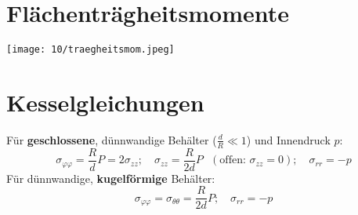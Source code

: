 \section{Flächenträgheitsmomente}
    \begin{center}
        \texttt{[image: 10/traegheitsmom.jpeg]}
    \end{center}
\section{Kesselgleichungen}
    Für \textbf{geschlossene}, dünnwandige Behälter ($\frac{d}{R} \ll 1$) und Innendruck $p$:
    \[\sigma_{\varphi\varphi} = \frac{R}{d}P = 2\sigma_{zz}; \quad \sigma_{zz} = \frac{R}{2d}P \textrm{ }(\textrm{offen: }\sigma_{zz}=0); \quad \sigma_{rr}=-p\]
    Für dünnwandige, \textbf{kugelförmige} Behälter:
    \[\sigma_{\varphi\varphi}=\sigma_{\theta\theta}=\frac{R}{2d}P; \quad \sigma_{rr}=-p\]
